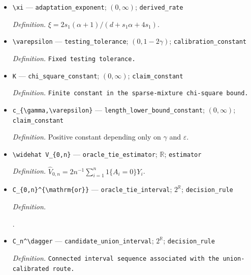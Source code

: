 \documentclass{article}
\begin{document}
\begin{itemize}
  \par\smallskip\noindent\emph{Definition.} \(\delta_n=a_nN_nh_n^d\int_{[0,1]^d}\psi(z)dz/2\).
  \item \texttt{\textbackslash{}\allowbreak{}xi} --- \texttt{adaptation\_\allowbreak{}exponent}; \((0,\infty)\); \texttt{derived\_\allowbreak{}rate}
  \par\smallskip\noindent\emph{Definition.} \(\xi=2s_1(\alpha+1)/(d+s_1\alpha+4s_1)\).
  \item \texttt{\textbackslash{}\allowbreak{}varepsilon} --- \texttt{testing\_\allowbreak{}tolerance}; \((0,1-2\gamma)\); \texttt{calibration\_\allowbreak{}constant}
  \par\smallskip\noindent\emph{Definition.} \texttt{Fixed testing tolerance.}
  \item \texttt{K} --- \texttt{chi\_\allowbreak{}square\_\allowbreak{}constant}; \((0,\infty)\); \texttt{claim\_\allowbreak{}constant}
  \par\smallskip\noindent\emph{Definition.} \texttt{Finite constant in the sparse-\allowbreak{}mixture chi-\allowbreak{}square bound.}
  \item \texttt{c\_\allowbreak{}\{\textbackslash{}\allowbreak{}gamma,\allowbreak{}\textbackslash{}\allowbreak{}varepsilon\}\allowbreak{}} --- \texttt{length\_\allowbreak{}lower\_\allowbreak{}bound\_\allowbreak{}constant}; \((0,\infty)\); \texttt{claim\_\allowbreak{}constant}
  \par\smallskip\noindent\emph{Definition.} Positive constant depending only on \(\gamma\) and \(\varepsilon\).
  \item \texttt{\textbackslash{}\allowbreak{}widehat V\_\allowbreak{}\{0,\allowbreak{}n\}\allowbreak{}} --- \texttt{oracle\_\allowbreak{}tie\_\allowbreak{}estimator}; \(\mathbb R\); \texttt{estimator}
  \par\smallskip\noindent\emph{Definition.} \(\widehat V_{0,n}=2n^{-1}\sum_{i=1}^n1\{A_i=0\}Y_i\).
  \item \texttt{C\_\allowbreak{}\{0,\allowbreak{}n\}\allowbreak{}\textasciicircum{}\{\textbackslash{}\allowbreak{}mathrm\{or\}\allowbreak{}\}\allowbreak{}} --- \texttt{oracle\_\allowbreak{}tie\_\allowbreak{}interval}; \(2^{\mathbb R}\); \texttt{decision\_\allowbreak{}rule}
  \par\smallskip\noindent\emph{Definition.} \par\noindent {}\par\noindent.
  \item \texttt{C\_\allowbreak{}n\textasciicircum{}\textbackslash{}\allowbreak{}dagger} --- \texttt{candidate\_\allowbreak{}union\_\allowbreak{}interval}; \(2^{\mathbb R}\); \texttt{decision\_\allowbreak{}rule}
  \par\smallskip\noindent\emph{Definition.} \texttt{Connected interval sequence associated with the union-\allowbreak{}calibrated route.}
\end{itemize}
\end{document}
